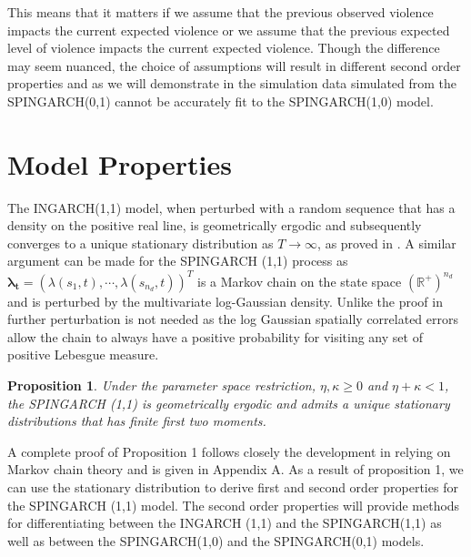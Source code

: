 \documentclass[11pt]{isuthesis}
\newtheorem{prop}{Proposition}
\begin{document}
This means that it matters if we assume that the previous observed violence impacts the current expected violence or we assume that the previous expected level of violence impacts the current expected violence.  Though the difference may seem nuanced, the choice of assumptions will result in different second order properties and as we will demonstrate in the simulation data simulated from the SPINGARCH(0,1) cannot be accurately fit to the SPINGARCH(1,0) model.


\section{Model Properties}

The INGARCH(1,1) model, when perturbed with a random sequence that has a density on the positive real line, is geometrically ergodic and subsequently converges to a unique stationary distribution as $T \to \infty$, as proved in \cite{fokianos2009poisson}.  A similar argument can be made for the SPINGARCH (1,1) process as $\boldsymbol{\lambda_t}=\left(\lambda(s_1,t),\cdots,\lambda(s_{n_d},t)\right)^T$ is a Markov chain on the state space $(\mathbb{R}^+)^{n_d}$ and is perturbed by the multivariate log-Gaussian density. Unlike the proof in \cite{fokianos2009poisson} further perturbation is not needed as the log Gaussian spatially correlated errors allow the chain to always have a positive probability for visiting any set of positive Lebesgue measure. 

\begin{prop} \label{Prop 1}
	Under the parameter space restriction, $\eta,\kappa\geq0$ and $\eta+\kappa<1$, the SPINGARCH (1,1) is geometrically ergodic and admits a unique stationary distributions that has finite first two moments.
\end{prop}
A complete proof of Proposition 1 follows closely the development in \cite{fokianos2009poisson} relying on Markov chain theory and is given in Appendix A.  As a result of proposition 1, we can use the stationary distribution to derive first and second order properties for the SPINGARCH (1,1) model.  The second order properties will provide methods for differentiating between the INGARCH (1,1) and the SPINGARCH(1,1) as well as between the SPINGARCH(1,0) and the SPINGARCH(0,1) models. 
\end{document}
